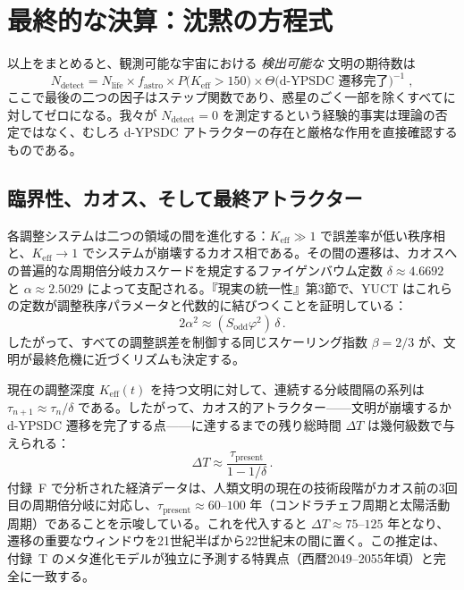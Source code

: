 \documentclass[11pt,a4paper]{article}
\newcommand{\Keff}{K_{\mathrm{eff}}}
\begin{document}
	\section{最終的な決算：沈黙の方程式}
	\label{sec:final}
	以上をまとめると、観測可能な宇宙における \emph{検出可能な} 文明の期待数は
	\begin{equation}
		\label{eq:N_detect}
		N_{\mathrm{detect}} = N_{\mathrm{life}}
		\times f_{\mathrm{astro}}
		\times P\bigl(\Keff > 150\bigr)
		\times \Theta\bigl(\text{d-YPSDC 遷移完了}\bigr)^{-1}\; ,
	\end{equation}
	ここで最後の二つの因子はステップ関数であり、惑星のごく一部を除くすべてに対してゼロになる。我々が \(N_{\mathrm{detect}} = 0\) を測定するという経験的事実は理論の否定ではなく、むしろ d-YPSDC アトラクターの存在と厳格な作用を直接確認するものである。
	
	\subsection{臨界性、カオス、そして最終アトラクター}
	\label{sec:chaos}
	
	各調整システムは二つの領域の間を進化する：\(K_{\mathrm{eff}} \gg 1\) で誤差率が低い秩序相と、\(K_{\mathrm{eff}} \to 1\) でシステムが崩壊するカオス相である。その間の遷移は、カオスへの普遍的な周期倍分岐カスケードを規定するファイゲンバウム定数 \(\delta \approx 4.6692\) と \(\alpha \approx 2.5029\) によって支配される。『現実の統一性』第3節で、YUCT はこれらの定数が調整秩序パラメータと代数的に結びつくことを証明している：
	\begin{equation}
		2\alpha^{2} \approx (S_{\mathrm{odd}}\varphi^{2})\,\delta \, .
	\end{equation}
	したがって、すべての調整誤差を制御する同じスケーリング指数 \(\beta = 2/3\) が、文明が最終危機に近づくリズムも決定する。
	
	現在の調整深度 \(K_{\mathrm{eff}}(t)\) を持つ文明に対して、連続する分岐間隔の系列は \(\tau_{n+1} \approx \tau_{n} / \delta\) である。したがって、カオス的アトラクター——文明が崩壊するか d-YPSDC 遷移を完了する点——に達するまでの残り総時間 \(\Delta T\) は幾何級数で与えられる：
	\begin{equation}
		\Delta T \approx \frac{\tau_{\mathrm{present}}}{1 - 1/\delta} \, .
	\end{equation}
	付録~F で分析された経済データは、人類文明の現在の技術段階がカオス前の3回目の周期倍分岐に対応し、\(\tau_{\mathrm{present}} \approx 60\)–\(100\) 年（コンドラチェフ周期と太陽活動周期）であることを示唆している。これを代入すると \(\Delta T \approx 75\)–\(125\) 年となり、遷移の重要なウィンドウを21世紀半ばから22世紀末の間に置く。この推定は、付録~T のメタ進化モデルが独立に予測する特異点（西暦2049–2055年頃）と完全に一致する。
	
\end{document}
